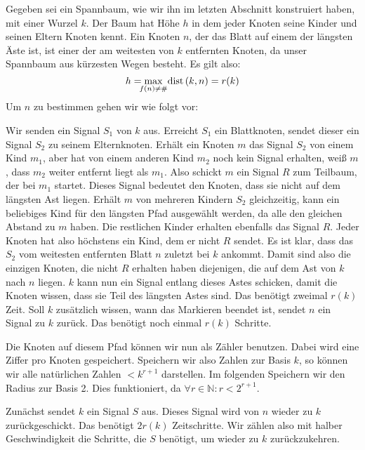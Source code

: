 \documentclass[11pt]{article}
\begin{document}
Gegeben sei ein Spannbaum, wie wir ihn im letzten Abschnitt konstruiert haben, mit einer Wurzel $k$. 
Der Baum hat Höhe $h$ in dem jeder Knoten seine Kinder und seinen Eltern Knoten kennt. 
Ein Knoten $n$, der das Blatt auf einem der längsten Äste ist, ist einer der am weitesten von $k$ entfernten Knoten, da unser Spannbaum aus kürzesten Wegen besteht. 
Es gilt also:
\begin{displaymath}
h = \max_{\mathclap{f\left(n\right) \neq \#}} \text{ dist}\left(k, n\right) = r(k)
\end{displaymath}
Um $n$ zu bestimmen gehen wir wie folgt vor:

Wir senden ein Signal $S_1$ von $k$ aus. Erreicht $S_1$ ein Blattknoten, sendet dieser ein Signal $S_2$ zu seinem Elternknoten. 
Erhält ein Knoten $m$ das Signal $S_2$ von einem Kind $m_1$, aber hat von einem anderen Kind $m_2$ noch kein Signal erhalten, weiß $m$, dass $m_2$ weiter entfernt liegt als $m_1$. 
Also schickt $m$ ein Signal $R$ zum Teilbaum, der bei $m_1$ startet. Dieses Signal bedeutet den Knoten, dass sie nicht auf dem längsten Ast liegen. 
Erhält $m$  von mehreren Kindern $S_2$ gleichzeitig, kann ein beliebiges Kind für den längsten Pfad ausgewählt werden, da alle den gleichen Abstand zu $m$ haben. 
Die restlichen Kinder erhalten ebenfalls das Signal $R$. 
Jeder Knoten hat also höchstens ein Kind, dem er nicht $R$ sendet. 
Es ist klar, dass das $S_2$ vom weitesten entfernten Blatt $n$ zuletzt bei $k$ ankommt. 
Damit sind also die einzigen Knoten, die nicht $R$ erhalten haben diejenigen, die auf dem Ast von $k$ nach $n$ liegen.
$k$ kann nun ein Signal entlang dieses Astes schicken, damit die Knoten wissen, dass sie Teil des längsten Astes sind.
Das benötigt zweimal $r(k)$ Zeit. Soll $k$ zusätzlich wissen, wann das Markieren beendet ist, sendet $n$ ein Signal zu $k$ zurück. Das benötigt noch einmal $r(k)$ Schritte.

Die Knoten auf diesem Pfad können wir nun als Zähler benutzen.
Dabei wird eine Ziffer pro Knoten gespeichert. Speichern wir also Zahlen zur Basis $k$, so können wir alle natürlichen Zahlen $< k^{r+1}$ darstellen. Im folgenden Speichern wir den Radius zur Basis 2. Dies funktioniert, da $\forall r \in \mathbb{N} : r < 2^{r+1}$.

Zunächst sendet $k$ ein Signal $S$ aus. Dieses Signal wird von $n$ wieder zu $k$ zurückgeschickt. Das benötigt $2r(k)$ Zeitschritte. Wir zählen also mit halber Geschwindigkeit die Schritte, die $S$ benötigt, um wieder zu $k$ zurückzukehren.
\end{document}
